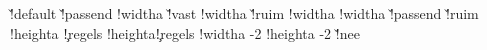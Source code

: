{   %
     \boxhasoffsetfalse
     \boxhasstrutfalse
     \boxisoverlaidtrue
     \@@localoffset\zeropoint
   \else
     \boxhasoffsettrue
     \boxhasstruttrue
     \boxisoverlaidfalse
     \ifx\localoffset\v!default %
       \let\localoffset\defaultframeoffset
     \else
       \let{}\localoffset
     \fi
     \@@localoffset\localoffset
     \advance\@@localoffset {}
   \fi\fi
   \ifx\localwidth\v!passend
     \ifboxhasformat
       \boxhaswidthtrue
       \!!widtha\hsize
     \else
       \boxhaswidthfalse
     \fi
   \else\ifx\localwidth\v!vast %
     \ifboxhasformat
       \boxhaswidthtrue
       \!!widtha\hsize
     \else
       \boxhaswidthfalse
     \fi
   \else\ifx\localwidth\v!ruim
     \boxhaswidthtrue
     \!!widtha\hsize
   \else
     \boxhaswidthtrue
     \!!widtha\localwidth
   \fi\fi\fi
   \ifx\localheight\v!passend
     \boxhasheightfalse %
   \else\ifx\localheight\v!ruim
     \boxhasheightfalse
   \else
     \boxhasheighttrue
     \!!heighta\localheight
   \fi\fi
   \ifboxhasheight 
   \else
       {\ifcase\framedparameter\c!regels\else
          \!!heighta\framedparameter\c!regels\lineheight
          \edef\localheight{\the\!!heighta}%
          \boxhasheighttrue
        \fi}%
   \fi
   \ifdim\!!widtha=\hsize
     \parindent\zeropoint
     \setlocalhsize
     \!!widtha\localhsize
   \fi
   \advance\!!widtha  -2\@@localoffset
   \advance\!!heighta -2\@@localoffset
   \ifx\localstrut\v!nee
     \boxhasstrutfalse
   \fi
   \ifboxhasstrut
     \setstrut
     \let\localbegstrut\begstrut
     \let\localendstrut\endstrut
     \let\localstrut   \strut
   \else
     \let\localbegstrut\pseudobegstrut %
     \let\localendstrut\pseudoendstrut %
     \let\localstrut   \pseudostrut    %
   \fi
   \ifboxhasheight
     \let\\\vboxednewline
     \ifboxhaswidth
       \let\hairline\vboxedhairline
       \ifboxhasformat
         \let\next\doformatboxSomeFormat
       \else
         \let\next\doformatboxNoFormat
}
